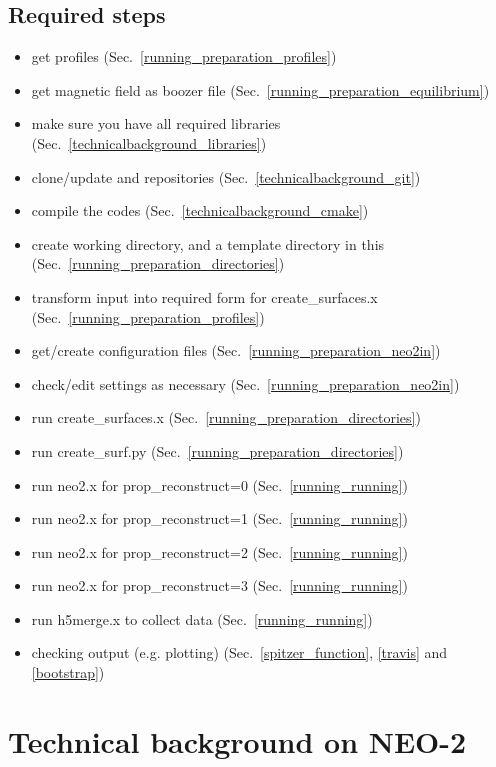 \documentclass{article}
\newcommand{\vv}[1]{\texttt{\detokenize{#1}}}
\begin{document}
\subsection{Required steps}
\begin{itemize}
  \item get profiles (Sec.~\ref{running_preparation_profiles})
  \item get magnetic field as boozer file (Sec.~\ref{running_preparation_equilibrium})
  \item make sure you have all required libraries (Sec.~\ref{technicalbackground_libraries})
  \item clone/update \vv{libneo} and \vv{NEO-2} repositories (Sec.~\ref{technicalbackground_git})
  \item compile the codes (Sec.~\ref{technicalbackground_cmake})
  \item create working directory, and a template directory in this (Sec.~\ref{running_preparation_directories})
  \item transform input into required form for create\_surfaces.x (Sec.~\ref{running_preparation_profiles})
  \item get/create configuration files (Sec.~\ref{running_preparation_neo2in})
  \item check/edit settings as necessary (Sec.~\ref{running_preparation_neo2in})
  \item run create\_surfaces.x (Sec.~\ref{running_preparation_directories})
  \item run create\_surf.py (Sec.~\ref{running_preparation_directories})
  \item run neo2.x for prop\_reconstruct=0 (Sec.~\ref{running_running})
  \item run neo2.x for prop\_reconstruct=1 (Sec.~\ref{running_running})
  \item run neo2.x for prop\_reconstruct=2 (Sec.~\ref{running_running})
  \item run neo2.x for prop\_reconstruct=3 (Sec.~\ref{running_running})
  \item run h5merge.x to collect data (Sec.~\ref{running_running})
  \item checking output (e.g. plotting) (Sec.~\ref{spitzer_function}, \ref{travis} and \ref{bootstrap})
\end{itemize}

\section{Technical background on NEO-2}
\end{document}

